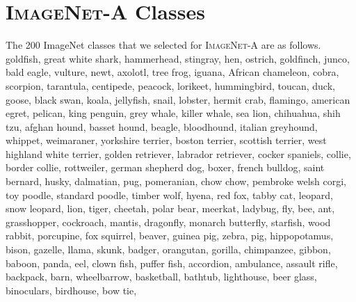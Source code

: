 \documentclass[10pt,twocolumn,letterpaper]{article}
\begin{document}
\newpage
\newpage

\section{\textsc{ImageNet-A} Classes}\label{app:classes}
The 200 ImageNet classes that we selected for \textsc{ImageNet-A} are as follows.
goldfish, \quad 
great white shark, \quad 
hammerhead, \quad 
stingray, \quad 
hen, \quad 
ostrich, \quad 
goldfinch, \quad 
junco, \quad 
bald eagle, \quad 
vulture, \quad 
newt, \quad 
axolotl, \quad 
tree frog, \quad 
iguana, \quad 
African chameleon, \quad 
cobra, \quad 
scorpion, \quad 
tarantula, \quad 
centipede, \quad 
peacock, \quad 
lorikeet, \quad 
hummingbird, \quad 
toucan, \quad 
duck, \quad 
goose, \quad 
black swan, \quad 
koala, \quad 
jellyfish, \quad 
snail, \quad 
lobster, \quad 
hermit crab, \quad 
flamingo, \quad 
american egret, \quad 
pelican, \quad 
king penguin, \quad 
grey whale, \quad 
killer whale, \quad 
sea lion, \quad 
chihuahua, \quad 
shih tzu, \quad 
afghan hound, \quad 
basset hound, \quad 
beagle, \quad 
bloodhound, \quad 
italian greyhound, \quad 
whippet, \quad 
weimaraner, \quad 
yorkshire terrier, \quad 
boston terrier, \quad 
scottish terrier, \quad 
west highland white terrier, \quad 
golden retriever, \quad 
labrador retriever, \quad 
cocker spaniels, \quad 
collie, \quad 
border collie, \quad 
rottweiler, \quad 
german shepherd dog, \quad 
boxer, \quad 
french bulldog, \quad 
saint bernard, \quad 
husky, \quad 
dalmatian, \quad 
pug, \quad 
pomeranian, \quad 
chow chow, \quad 
pembroke welsh corgi, \quad 
toy poodle, \quad 
standard poodle, \quad 
timber wolf, \quad 
hyena, \quad 
red fox, \quad 
tabby cat, \quad 
leopard, \quad 
snow leopard, \quad 
lion, \quad 
tiger, \quad 
cheetah, \quad 
polar bear, \quad 
meerkat, \quad 
ladybug, \quad 
fly, \quad 
bee, \quad 
ant, \quad 
grasshopper, \quad 
cockroach, \quad 
mantis, \quad 
dragonfly, \quad 
monarch butterfly, \quad 
starfish, \quad 
wood rabbit, \quad 
porcupine, \quad 
fox squirrel, \quad 
beaver, \quad 
guinea pig, \quad 
zebra, \quad 
pig, \quad 
hippopotamus, \quad 
bison, \quad 
gazelle, \quad 
llama, \quad 
skunk, \quad 
badger, \quad 
orangutan, \quad 
gorilla, \quad 
chimpanzee, \quad 
gibbon, \quad 
baboon, \quad 
panda, \quad 
eel, \quad 
clown fish, \quad 
puffer fish, \quad 
accordion, \quad 
ambulance, \quad 
assault rifle, \quad 
backpack, \quad 
barn, \quad 
wheelbarrow, \quad 
basketball, \quad 
bathtub, \quad 
lighthouse, \quad 
beer glass, \quad 
binoculars, \quad 
birdhouse, \quad 
bow tie, \quad 
\end{document}
